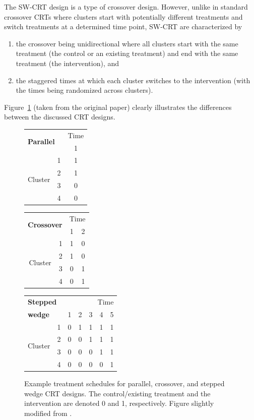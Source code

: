 \documentclass[10pt]{article}
\begin{document}
The SW-CRT design is a type of crossover design. However, unlike in standard crossover CRTs where clusters start with potentially different treatments and switch treatments at a determined time point, SW-CRT are characterized by
\begin{enumerate}

\item
the crossover being unidirectional where all clusters start with the same treatment (the control or an existing treatment) and end with the same treatment (the intervention), and

\item
the staggered times at which each cluster switches to the intervention (with the times being randomized across clusters).

\end{enumerate}
Figure~\ref{fig:designs} (taken from the original paper) clearly illustrates the differences between the discussed CRT designs.

\begin{figure}[H]
\centering
\begin{tabular}{@{}rr|c@{}}
\multicolumn{2}{l|}{\multirow{2}{*}{\textbf{Parallel}}} & \multicolumn{1}{r}{Time} \\
& & 1 \\
\hline
\multirow{4}{*}{Cluster} & 1 & 1 \\
& 2 & 1 \\
& 3 & 0 \\
& 4 & 0
\end{tabular}
\qquad
\begin{tabular}{@{}rr|cc@{}}
\multicolumn{2}{l|}{\multirow{2}{*}{\textbf{Crossover}}} & \multicolumn{2}{r}{Time} \\
& & 1 & 2 \\
\hline
\multirow{4}{*}{Cluster} & 1 & 1 & 0 \\
& 2 & 1 & 0 \\
& 3 & 0 & 1\\
& 4 & 0 & 1
\end{tabular}
\qquad
\begin{tabular}{@{}rr|ccccc@{}}
\multicolumn{2}{l|}{\textbf{Stepped}} & \multicolumn{5}{r}{Time} \\
 \multicolumn{2}{l|}{\textbf{wedge}} & 1 & 2 & 3 & 4 & 5 \\
\hline
\multirow{4}{*}{Cluster} & 1 & 0 & 1 & 1 & 1 & 1 \\
& 2 & 0 & 0 & 1 & 1 & 1 \\
& 3 & 0 & 0 & 0 & 1 & 1 \\
& 4 & 0 & 0 & 0 & 0 & 1
\end{tabular}
\caption{Example treatment schedules for parallel, crossover, and stepped wedge CRT designs. The control/existing treatment and the intervention are denoted 0 and 1, respectively. Figure slightly modified from \parencite{Hussey:2007}.}
\label{fig:designs}
\end{figure}
\end{document}
